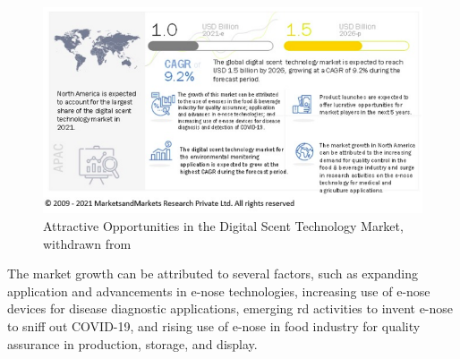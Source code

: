 \begin{figure}[htb!]
\centering
    \includegraphics[width=0.9\columnwidth]{./img/scentstats.png}
  \caption{Attractive Opportunities in the Digital Scent Technology Market, withdrawn from~\cite{scent-money}}%
\label{fig:scent-stat}
\end{figure}

The market growth can be attributed to several factors, such as expanding application and advancements in e-nose technologies, increasing use of e-nose devices for disease diagnostic applications, emerging \gls{rd} activities to invent e-nose to sniff out COVID-19, and rising use of e-nose in food industry for quality assurance in production, storage, and display.


%
%


%

